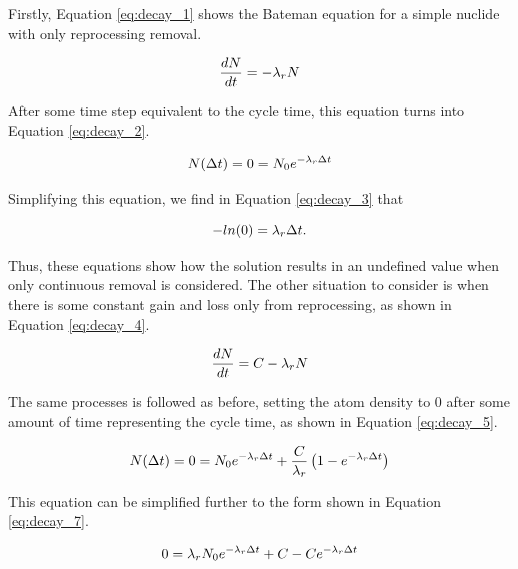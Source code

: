 Firstly, Equation \eqref{eq:decay_1} shows the Bateman equation for a simple nuclide with only reprocessing removal.

\begin{equation} \hfill
\frac{dN}{dt} = -\lambda_r N
\hfill\label{eq:decay_1} \end{equation}

After some time step equivalent to the cycle time, this equation turns into Equation \eqref{eq:decay_2}.

\begin{equation} \hfill
N(\Delta t) = 0 = N_0 e^{-\lambda_r \Delta t}
\hfill\label{eq:decay_2} \end{equation}

Simplifying this equation, we find in Equation \eqref{eq:decay_3} that

\begin{equation} \hfill
-ln(0) = \lambda_r \Delta t.
\hfill\label{eq:decay_3} \end{equation}

Thus, these equations show how the solution results in an undefined value when only continuous removal is considered. The other situation to consider is when there is some constant gain and loss only from reprocessing, as shown in Equation \eqref{eq:decay_4}.

\begin{equation} \hfill
\frac{dN}{dt} = C -\lambda_r N
\hfill\label{eq:decay_4} \end{equation}

The same processes is followed as before, setting the atom density to 0 after some amount of time representing the cycle time, as shown in Equation \eqref{eq:decay_5}.

\begin{equation} \hfill
N(\Delta t) = 0 = N_0 e^{-\lambda_r \Delta t} + \frac{C}{\lambda_r} \left( 1 - e^{-\lambda_r \Delta t} \right)
\hfill\label{eq:decay_5} \end{equation}




This equation can be simplified further to the form shown in Equation \eqref{eq:decay_7}.

\begin{equation} \hfill
0 = \lambda_r N_0 e^{-\lambda_r \Delta t} + C - C e^{-\lambda_r \Delta t}
\hfill\label{eq:decay_7} \end{equation}


